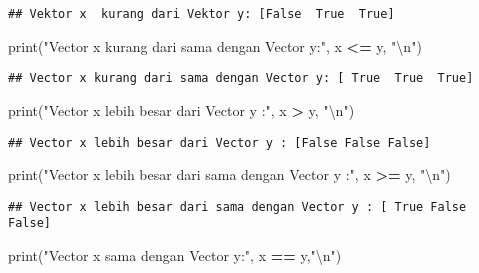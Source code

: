\documentclass[
]{docs}
\newenvironment{Shaded}{\begin{snugshade}}{\end{snugshade}}
\newcommand{\BuiltInTok}[1]{#1}
\newcommand{\CharTok}[1]{\textcolor[rgb]{0.31,0.60,0.02}{#1}}
\newcommand{\NormalTok}[1]{#1}
\newcommand{\OperatorTok}[1]{\textcolor[rgb]{0.81,0.36,0.00}{\textbf{#1}}}
\newcommand{\StringTok}[1]{\textcolor[rgb]{0.31,0.60,0.02}{#1}}
\begin{document}
\begin{verbatim}
## Vektor x  kurang dari Vektor y: [False  True  True]
\end{verbatim}

\begin{Shaded}
\begin{Highlighting}[]
\BuiltInTok{print}\NormalTok{(}\StringTok{"Vector x kurang dari sama dengan Vector y:"}\NormalTok{, x }\OperatorTok{\textless{}=}\NormalTok{ y, }\StringTok{"}\CharTok{\textbackslash{}n}\StringTok{"}\NormalTok{)}
\end{Highlighting}
\end{Shaded}

\begin{verbatim}
## Vector x kurang dari sama dengan Vector y: [ True  True  True]
\end{verbatim}

\begin{Shaded}
\begin{Highlighting}[]
\BuiltInTok{print}\NormalTok{(}\StringTok{"Vector x lebih besar dari Vector y :"}\NormalTok{, x }\OperatorTok{\textgreater{}}\NormalTok{ y, }\StringTok{"}\CharTok{\textbackslash{}n}\StringTok{"}\NormalTok{)}
\end{Highlighting}
\end{Shaded}

\begin{verbatim}
## Vector x lebih besar dari Vector y : [False False False]
\end{verbatim}

\begin{Shaded}
\begin{Highlighting}[]
\BuiltInTok{print}\NormalTok{(}\StringTok{"Vector x lebih besar dari sama dengan Vector y :"}\NormalTok{, x }\OperatorTok{\textgreater{}=}\NormalTok{ y, }\StringTok{"}\CharTok{\textbackslash{}n}\StringTok{"}\NormalTok{)}
\end{Highlighting}
\end{Shaded}

\begin{verbatim}
## Vector x lebih besar dari sama dengan Vector y : [ True False False]
\end{verbatim}

\begin{Shaded}
\begin{Highlighting}[]
\BuiltInTok{print}\NormalTok{(}\StringTok{"Vector x sama dengan Vector y:"}\NormalTok{, x }\OperatorTok{==}\NormalTok{ y,}\StringTok{"}\CharTok{\textbackslash{}n}\StringTok{"}\NormalTok{) }
\end{Highlighting}
\end{Shaded}
\end{document}
